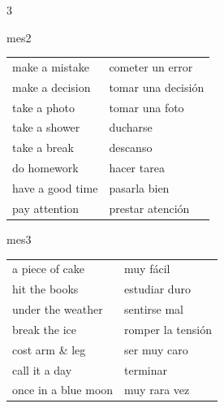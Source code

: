 \documentclass[10pt,a4paper,landscape]{article}
\begin{document}
\begin{multicols}{3}
\vspace{0.2cm}

\begin{cajaseccion}{mes2}
{\scriptsize
\begin{tabularx}{\linewidth}{@{} l l @{}}
\toprule
make a mistake & cometer un error \\
make a decision & tomar una decisión \\
take a photo & tomar una foto \\
take a shower & ducharse \\
take a break & descanso \\
do homework & hacer tarea \\
have a good time & pasarla bien \\
pay attention & prestar atención \\
\bottomrule
\end{tabularx}
}
\end{cajaseccion}

\vspace{0.2cm}

\begin{cajaseccion}{mes3}
{\scriptsize
\begin{tabularx}{\linewidth}{@{} l l @{}}
\toprule
a piece of cake & muy fácil \\
hit the books & estudiar duro \\
under the weather & sentirse mal \\
break the ice & romper la tensión \\
cost arm \& leg & ser muy caro \\
call it a day & terminar \\
once in a blue moon & muy rara vez \\
\bottomrule
\end{tabularx}
}
\end{cajaseccion}

\vspace{0.2cm}


\end{multicols}
\end{document}
